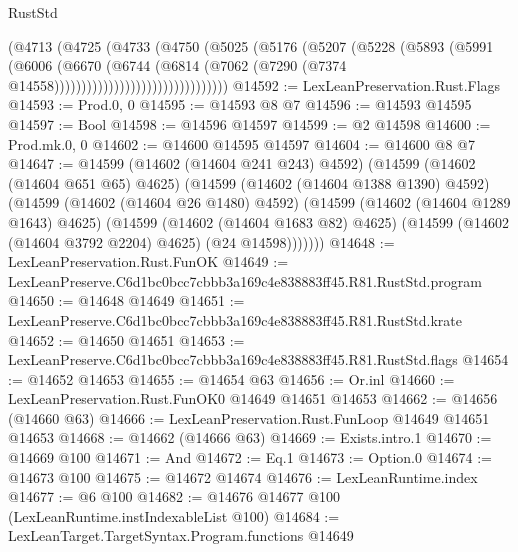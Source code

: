 \begin{lexlean}{RustStd}
\begin{coremodule}
                                  (@4713
                                    (@4725
                                      (@4733
                                        (@4750
                                          (@5025
                                            (@5176
                                              (@5207
                                                (@5228
                                                  (@5893
                                                    (@5991
                                                      (@6006
                                                        (@6670
                                                          (@6744
                                                            (@6814
                                                              (@7062
                                                                (@7290
                                                                  (@7374
                                                                    @14558))))))))))))))))))))))))))))))))
@14592 := LexLeanPreservation.Rust.Flags
@14593 := Prod.{0, 0}
@14595 := @14593 @8 @7
@14596 := @14593 @14595
@14597 := Bool
@14598 := @14596 @14597
@14599 := @2 @14598
@14600 := Prod.mk.{0, 0}
@14602 := @14600 @14595 @14597
@14604 := @14600 @8 @7
@14647 := @14599
    (@14602 (@14604 @241 @243) @4592)
    (@14599
      (@14602 (@14604 @651 @65) @4625)
      (@14599
        (@14602 (@14604 @1388 @1390) @4592)
        (@14599
          (@14602 (@14604 @26 @1480) @4592)
          (@14599
            (@14602 (@14604 @1289 @1643) @4625)
            (@14599
              (@14602 (@14604 @1683 @82) @4625)
              (@14599 (@14602 (@14604 @3792 @2204) @4625) (@24 @14598)))))))
@14648 := LexLeanPreservation.Rust.FunOK
@14649 := LexLeanPreserve.C6d1bc0bcc7cbbb3a169c4e838883ff45.R81.RustStd.program
@14650 := @14648 @14649
@14651 := LexLeanPreserve.C6d1bc0bcc7cbbb3a169c4e838883ff45.R81.RustStd.krate
@14652 := @14650 @14651
@14653 := LexLeanPreserve.C6d1bc0bcc7cbbb3a169c4e838883ff45.R81.RustStd.flags
@14654 := @14652 @14653
@14655 := @14654 @63
@14656 := Or.inl
@14660 := LexLeanPreservation.Rust.FunOK0 @14649 @14651 @14653
@14662 := @14656 (@14660 @63)
@14666 := LexLeanPreservation.Rust.FunLoop @14649 @14651 @14653
@14668 := @14662 (@14666 @63)
@14669 := Exists.intro.{1}
@14670 := @14669 @100
@14671 := And
@14672 := Eq.{1}
@14673 := Option.{0}
@14674 := @14673 @100
@14675 := @14672 @14674
@14676 := LexLeanRuntime.index
@14677 := @6 @100
@14682 := @14676 @14677 @100 (LexLeanRuntime.instIndexableList @100)
@14684 := LexLeanTarget.TargetSyntax.Program.functions @14649

\end{coremodule}
\end{lexlean}
